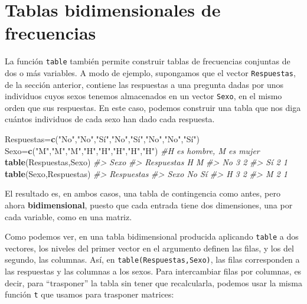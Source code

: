 \documentclass[
]{book}
\newenvironment{Shaded}{\begin{snugshade}}{\end{snugshade}}
\newcommand{\CommentTok}[1]{\textcolor[rgb]{0.56,0.35,0.01}{\textit{#1}}}
\newcommand{\KeywordTok}[1]{\textcolor[rgb]{0.13,0.29,0.53}{\textbf{#1}}}
\newcommand{\NormalTok}[1]{#1}
\newcommand{\StringTok}[1]{\textcolor[rgb]{0.31,0.60,0.02}{#1}}
\theoremstyle{definition}
\theoremstyle{definition}
\theoremstyle{definition}
\theoremstyle{remark}
\begin{document}
\hypertarget{tablas-bidimensionales-de-frecuencias}{%
\section{Tablas bidimensionales de frecuencias}\label{tablas-bidimensionales-de-frecuencias}}

La función \texttt{table} también permite construir tablas de frecuencias conjuntas de dos o más variables. A modo de ejemplo, supongamos que el vector \texttt{Respuestas}, de la sección anterior, contiene las respuestas a una pregunta dadas por unos individuos cuyos sexos tenemos almacenados en un vector \texttt{Sexo}, en el mismo orden que sus respuestas. En este caso, podemos construir una tabla que nos diga cuántos individuos de cada sexo han dado cada respuesta.

\begin{Shaded}
\begin{Highlighting}[]
\NormalTok{Respuestas=}\KeywordTok{c}\NormalTok{(}\StringTok{"No"}\NormalTok{,}\StringTok{"No"}\NormalTok{,}\StringTok{"Sí"}\NormalTok{,}\StringTok{"No"}\NormalTok{,}\StringTok{"Sí"}\NormalTok{,}\StringTok{"No"}\NormalTok{,}\StringTok{"No"}\NormalTok{,}\StringTok{"Sí"}\NormalTok{)}
\NormalTok{Sexo=}\KeywordTok{c}\NormalTok{(}\StringTok{"M"}\NormalTok{,}\StringTok{"M"}\NormalTok{,}\StringTok{"M"}\NormalTok{,}\StringTok{"H"}\NormalTok{,}\StringTok{"H"}\NormalTok{,}\StringTok{"H"}\NormalTok{,}\StringTok{"H"}\NormalTok{,}\StringTok{"H"}\NormalTok{) }\CommentTok{\#H es hombre, M es mujer}
\KeywordTok{table}\NormalTok{(Respuestas,Sexo)}
\CommentTok{\#\textgreater{}           Sexo}
\CommentTok{\#\textgreater{} Respuestas H M}
\CommentTok{\#\textgreater{}         No 3 2}
\CommentTok{\#\textgreater{}         Sí 2 1}
\KeywordTok{table}\NormalTok{(Sexo,Respuestas)}
\CommentTok{\#\textgreater{}     Respuestas}
\CommentTok{\#\textgreater{} Sexo No Sí}
\CommentTok{\#\textgreater{}    H  3  2}
\CommentTok{\#\textgreater{}    M  2  1}
\end{Highlighting}
\end{Shaded}

El resultado es, en ambos casos, una tabla de contingencia como antes, pero ahora \textbf{bidimensional}, puesto que cada entrada tiene dos dimensiones, una por cada variable, como en una matriz.

Como podemos ver, en una tabla bidimensional producida aplicando \texttt{table} a dos vectores, los niveles del primer vector en el argumento definen las filas, y los del segundo, las columnas. Así, en \texttt{table(Respuestas,Sexo)}, las filas corresponden a las respuestas y las columnas a los sexos.
Para intercambiar filas por columnas, es decir, para ``trasponer'' la tabla sin tener que recalcularla, podemos usar la misma función \texttt{t} que usamos para trasponer matrices:
\end{document}
